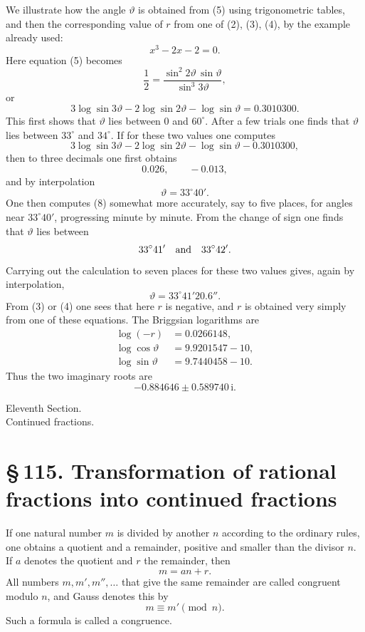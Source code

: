 \documentclass[11pt]{article}
\providecommand{\ii}{\mathrm{i}}
\providecommand{\sect}[2]{\section*{\S\,#1. #2}}
\begin{document}
We illustrate how the angle $\vartheta$ is obtained from (5) using trigonometric tables, and then the corresponding value of $r$ from one of (2), (3), (4), by the example already used:
\[
        x^3-2x-2=0.
\]
Here equation (5) becomes
\begin{equation}
        \frac12=\frac{\sin^2 2\vartheta\,\sin\vartheta}
                       {\sin^3 3\vartheta},
\tag{6}
\end{equation}
or
\begin{equation}
        3\log\sin3\vartheta-2\log\sin2\vartheta-\log\sin\vartheta=0.3010300.
\tag{7}
\end{equation}
This first shows that $\vartheta$ lies between $0$ and $60^\circ$. After a few trials one finds that $\vartheta$ lies between $33^\circ$ and $34^\circ$. If for these two values one computes
\begin{equation}
        3\log\sin3\vartheta-2\log\sin2\vartheta-\log\sin\vartheta-0.3010300,
\tag{8}
\end{equation}
then to three decimals one first obtains
\[
        0.026,\qquad -0.013,
\]
and by interpolation
\[
        \vartheta=33^\circ40'.
\]
One then computes (8) somewhat more accurately, say to five places, for angles near $33^\circ40'$, progressing minute by minute. From the change of sign one finds that $\vartheta$ lies between
\[
        33^\circ41'\quad\hbox{and}\quad 33^\circ42'.
\]
Carrying out the calculation to seven places for these two values gives, again by interpolation,
\[
        \vartheta=33^\circ41'20.6''.
\]
From (3) or (4) one sees that here $r$ is negative, and $r$ is obtained very simply from one of these equations. The Briggsian logarithms are
\[
\begin{aligned}
\log(-r)&=0.0266148,\\
\log\cos\vartheta&=9.9201547-10,\\
\log\sin\vartheta&=9.7440458-10.
\end{aligned}
\]
Thus the two imaginary roots are
\[
        -0.884646\pm0.589740\,\ii.
\]

\begin{center}
{\Large Eleventh Section.}\\[0.6em]
{\large Continued fractions.}
\end{center}

\sect{115}{Transformation of rational fractions into continued fractions}

If one natural number $m$ is divided by another $n$ according to the ordinary rules, one obtains a quotient and a remainder, positive and smaller than the divisor $n$. If $a$ denotes the quotient and $r$ the remainder, then
\begin{equation}
        m=an+r.
\tag{1}
\end{equation}
All numbers $m,m',m'',\ldots$ that give the same remainder are called congruent modulo $n$, and Gauss denotes this by
\begin{equation}
        m\equiv m'\pmod n.
\tag{2}
\end{equation}
Such a formula is called a congruence.
\end{document}
